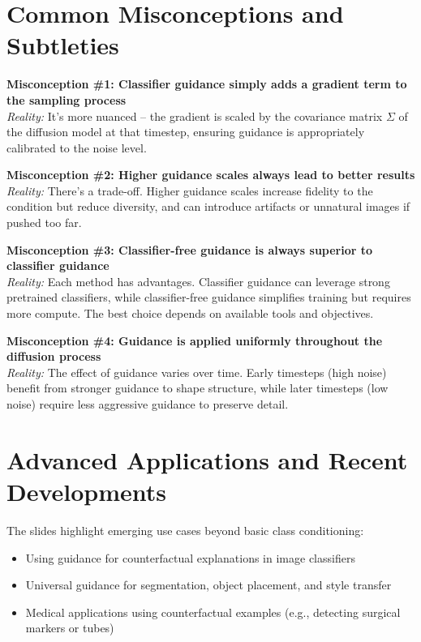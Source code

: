 \section{Common Misconceptions and Subtleties}

\textbf{Misconception \#1: Classifier guidance simply adds a gradient term to the sampling process}\\
\textit{Reality:} It's more nuanced – the gradient is scaled by the covariance matrix $\Sigma$ of the diffusion model at that timestep, ensuring guidance is appropriately calibrated to the noise level.

\vspace{0.5em}
\textbf{Misconception \#2: Higher guidance scales always lead to better results}\\
\textit{Reality:} There’s a trade-off. Higher guidance scales increase fidelity to the condition but reduce diversity, and can introduce artifacts or unnatural images if pushed too far.

\vspace{0.5em}
\textbf{Misconception \#3: Classifier-free guidance is always superior to classifier guidance}\\
\textit{Reality:} Each method has advantages. Classifier guidance can leverage strong pretrained classifiers, while classifier-free guidance simplifies training but requires more compute. The best choice depends on available tools and objectives.

\vspace{0.5em}
\textbf{Misconception \#4: Guidance is applied uniformly throughout the diffusion process}\\
\textit{Reality:} The effect of guidance varies over time. Early timesteps (high noise) benefit from stronger guidance to shape structure, while later timesteps (low noise) require less aggressive guidance to preserve detail.

\section{Advanced Applications and Recent Developments}

The slides highlight emerging use cases beyond basic class conditioning:

\begin{itemize}
    \item Using guidance for counterfactual explanations in image classifiers
    \item Universal guidance for segmentation, object placement, and style transfer
    \item Medical applications using counterfactual examples (e.g., detecting surgical markers or tubes)
\end{itemize}

